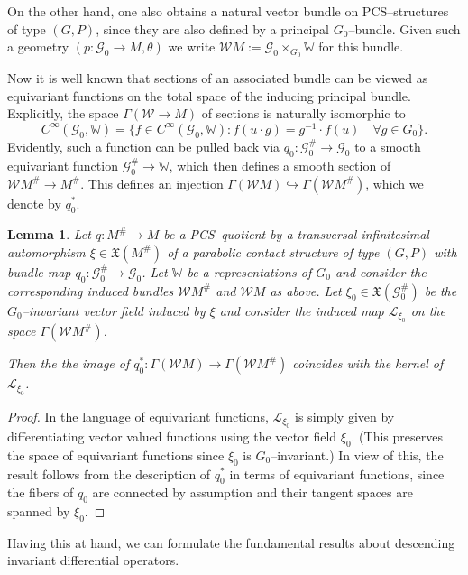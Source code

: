 \documentclass[12pt,a4paper]{amsart}
\def\frak{\mathfrak}
\def\Bbb{\mathbb}
\def\Cal{\mathcal}
\newcommand{\x}{\times}
\renewcommand{\th}{\theta}
\newcommand{\Ga}{\Gamma}
\newcounter{theorem}
\numberwithin{theorem}{section}
\newtheorem{lemma}[theorem]{Lemma}
\theoremstyle{definition}
\theoremstyle{remark}
\begin{document}
On the other hand, one also obtains a natural vector bundle on
PCS--structures of type $(G,P)$, since they are also defined by a
principal $G_0$--bundle. Given such a geometry $(p:\Cal G_0\to M,\th)$
we write $\Cal WM:=\Cal G_0\x_{G_0}\Bbb W$ for this bundle.

Now it is well known that sections of an associated bundle can be
viewed as equivariant functions on the total space of the inducing
principal bundle. Explicitly, the space $\Ga(\Cal W\to M)$ of sections
is naturally isomorphic to 
$$
C^\infty(\Cal G_0,\Bbb W)=\{f\in C^\infty(\Cal G_0,\Bbb W):f(u\cdot
g)=g^{-1}\cdot f(u)\quad\forall g\in G_0\}. 
$$
Evidently, such a function can be pulled back via $q_0:\Cal
G_0^\#\to\Cal G_0$ to a smooth equivariant function $\Cal
G_0^\#\to\Bbb W$, which then defines a smooth section of $\Cal
WM^\#\to M^\#$. This defines an injection $\Ga(\Cal
WM)\hookrightarrow\Ga(\Cal WM^\#)$, which we denote by $q_0^*$.

\begin{lemma}\label{lem2.4}
  Let $q:M^\#\to M$ be a PCS--quotient by a transversal infinitesimal
  automorphism $\xi\in\frak X(M^\#)$ of a parabolic contact structure
  of type $(G,P)$ with bundle map $q_0:\Cal G_0^\#\to\Cal G_0$. Let
  $\Bbb W$ be a representations of $G_0$ and consider the
  corresponding induced bundles $\Cal WM^\#$ and $\Cal WM$ as
  above. Let $\xi_0\in\frak X(\Cal G_0^\#)$ be the $G_0$--invariant
  vector field induced by $\xi$ and consider the induced map $\Cal
  L_{\xi_0}$ on the space $\Ga(\Cal WM^\#)$.

Then the the image of $q_0^*:\Ga(\Cal WM)\to\Ga(\Cal WM^\#)$ coincides
with the kernel of $\Cal L_{\xi_0}$. 
\end{lemma}
\begin{proof}
  In the language of equivariant functions, $\Cal L_{\xi_0}$ is simply
  given by differentiating vector valued functions using the vector
  field $\xi_0$. (This preserves the space of equivariant functions
  since $\xi_0$ is $G_0$--invariant.) In view of this, the result
  follows from the description of $q_0^*$ in terms of equivariant
  functions, since the fibers of $q_0$ are connected by assumption and
  their tangent spaces are spanned by $\xi_0$.
\end{proof}

Having this at hand, we can formulate the fundamental results about
descending invariant differential operators.
\end{document}
